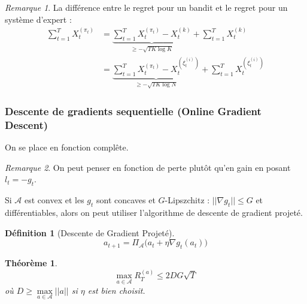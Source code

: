\documentclass{article}
\newtheorem{definition}{Définition}[section]
\newtheorem{theorem}{Théorème}[section]
\theoremstyle{remark}
\theoremstyle{remark}
\newtheorem{remark}{Remarque}[section]
\begin{document}
\begin{remark}
   La différence entre le regret pour un bandit et le regret pour un système d'expert :
   \begin{align*}
      \sum_{t=1}^T X_t^{(\pi_t)}
      &= \underbrace{\sum_{t=1}^T X_t^{(\pi_t)} - X_t^{(k)}}_{\geq - \sqrt{T K \log K}} + \sum_{t=1}^T X_t^{(k)} \\
      &= \underbrace{\sum_{t=1}^T X_t^{(\pi_t)} - X_t^{(\xi_t^{(i)})}}_{\geq - \sqrt{T K \log N}} + \sum_{t=1}^T X_t^{(\xi_t^{(i)})}
   \end{align*}
\end{remark}

\subsubsection{Descente de gradients sequentielle (Online Gradient Descent)}

On se place en fonction complête.

\begin{remark}
   On peut penser en fonction de perte plutôt qu'en gain en posant $l_t = - g_t$.
\end{remark}

Si $\mathcal{A}$ est convex et les $g_t$ sont concaves et $G$-Lipszchitz : $||\nabla g_t|| \leq G$ et différentiables, alors on peut utiliser l'algorithme de descente de gradient projeté.

\begin{definition}[Descente de Gradient Projeté]
   $$
   a_{t+1} = \Pi_{\mathcal{A}}\Big( a_t + \eta \nabla g_t(a_t) \Big)
   $$
\end{definition}

\begin{theorem}
   $$
   \max_{a \in \mathcal{A}} R_T^{(a)} \leq 2 D G \sqrt{T}
   $$
   où $D \geq \max\limits_{a \in \mathcal{A}} ||a||$ si $\eta$ est bien choisit.
\end{theorem}
\end{document}
